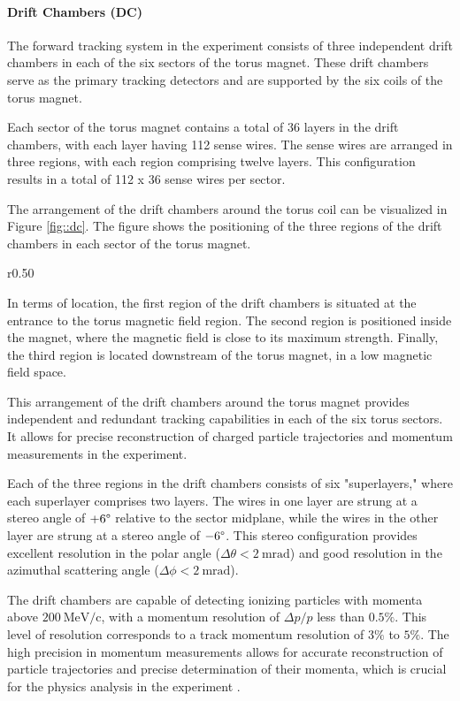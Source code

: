 \paragraph{Drift Chambers (DC)}
\label{par::dc}
    The forward tracking system in the experiment consists of three independent drift chambers in each of the six sectors of the torus magnet.
    These drift chambers serve as the primary tracking detectors and are supported by the six coils of the torus magnet.

    Each sector of the torus magnet contains a total of 36 layers in the drift chambers, with each layer having 112 sense wires.
    The sense wires are arranged in three regions, with each region comprising twelve layers.
    This configuration results in a total of 112 x 36 sense wires per sector.

    The arrangement of the drift chambers around the torus coil can be visualized in Figure \ref{fig::dc}.
    The figure shows the positioning of the three regions of the drift chambers in each sector of the torus magnet.

    \begin{wrapfigure}{r}{0.50\textwidth}
        \centering{}
        \caption[DC]{Drift Chambers render.
        Each of the DC regions are denoted as R1, R2, and R3 in the figure.
        Source: \hyperlink{https://www.jlab.org/physics/hall-b/clas12}{CLAS12 wiki}.}
        \label{fig::dc}
    \end{wrapfigure}

    In terms of location, the first region of the drift chambers is situated at the entrance to the torus magnetic field region.
    The second region is positioned inside the magnet, where the magnetic field is close to its maximum strength.
    Finally, the third region is located downstream of the torus magnet, in a low magnetic field space.

    This arrangement of the drift chambers around the torus magnet provides independent and redundant tracking capabilities in each of the six torus sectors.
    It allows for precise reconstruction of charged particle trajectories and momentum measurements in the experiment.

    Each of the three regions in the drift chambers consists of six "superlayers," where each superlayer comprises two layers.
    The wires in one layer are strung at a stereo angle of $+6\degree$ relative to the sector midplane, while the wires in the other layer are strung at a stereo angle of $-6\degree$.
    This stereo configuration provides excellent resolution in the polar angle ($\Delta\theta < 2 ~\text{mrad}$) and good resolution in the azimuthal scattering angle ($\Delta\phi < 2 ~\text{mrad}$).

    The drift chambers are capable of detecting ionizing particles with momenta above $200 ~\text{MeV}/\text{c}$, with a momentum resolution of $\Delta p/p$ less than $0.5\%$. This level of resolution corresponds to a track momentum resolution of $3\%$ to $5\%$.
    The high precision in momentum measurements allows for accurate reconstruction of particle trajectories and precise determination of their momenta, which is crucial for the physics analysis in the experiment \cite{mestayer2020}.
